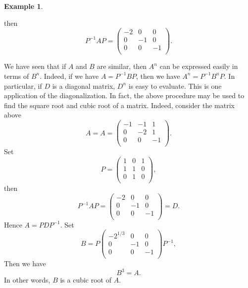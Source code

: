 \documentclass[11pt]{article}
\theoremstyle{definition}
\newtheorem{exmp}[thm]{Example}
\theoremstyle{plain}
\begin{document}
\begin{exmp}
\begin{enumerate}
\[\]
then
\[
P^{-1}AP = \left(\begin{array}{rrr} -2&0&0\\ 0&-1&0\\ 0&0&-1\\ \end{array}\right).
\]
\end{enumerate} 
We have seen that if $A$ and $B$ are similar, then $A^n$ can be expressed easily in terms of $B^n$. Indeed, if we have $A = P^{-1}BP$, then we have $A^n = P^{-1}B^nP$. In particular, if $D$ is a diagonal matrix, $D^n$ is easy to evaluate. This is one application of the diagonalization. In fact, the above procedure may be used to find the square root and cubic root of a matrix. Indeed, consider the matrix above
\[
A = A = \left(\begin{array}{rrr} -1&-1&1\\ 0&-2&1\\ 0&0&-1\\ \end{array}\right).
\]
Set
\[
P = \left(\begin{array}{rrr} 1&0&1\\ 1&1&0\\ 0&1&0\\ \end{array}\right),
\]
then
\[
P^{-1}AP = \left(\begin{array}{rrr} -2&0&0\\ 0&-1&0\\ 0&0&-1\\ \end{array}\right)=D.
\]
Hence $A = P D P^{-1}$. Set
\[
B = P \left(\begin{array}{rrr} -2^{1/3}&0&0\\ 0&-1&0\\ 0&0&-1\\ \end{array}\right) P^{-1},
\]
Then we have
\[B^3 = A.\]
In other words, $B$ is a cubic root of $A$.
\end{exmp}
\end{document}
